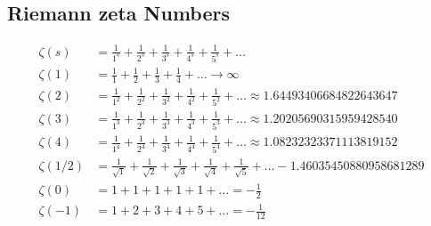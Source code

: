 \documentclass[12pt]{article}
\begin{document}
\subsection*{Riemann zeta Numbers}
\begin{align*}
 \zeta(s) 
  & = \frac{1}{1^{s}} + \frac{1}{2^{s}} + \frac{1}{3^{s}} + \frac{1}{4^{s}} + \frac{1}{5^{s}} + \ldots \\
 \zeta(1) 
  & = \frac{1}{1} + \frac{1}{2} + \frac{1}{3} + \frac{1}{4} + \ldots \rightarrow \infty \\
 \zeta(2) 
  & = \frac{1}{1^{2}} + \frac{1}{2^{2}} + \frac{1}{3^{2}} + \frac{1}{4^{2}} + \frac{1}{5^{2}} + \ldots \approx 1.64493 40668 48226 43647 \\
 \zeta(3) 
  & = \frac{1}{1^{3}} + \frac{1}{2^{3}} + \frac{1}{3^{3}} + \frac{1}{4^{3}} + \frac{1}{5^{3}} + \ldots \approx 1.20205 69031 59594 28540 \\
 \zeta(4) 
  & = \frac{1}{1^{4}} + \frac{1}{2^{4}} + \frac{1}{3^{4}} + \frac{1}{4^{4}} + \frac{1}{5^{4}} + \ldots \approx 1.08232 32337 11138 19152 \\
 \zeta(1/2) 
  & = \frac{1}{\sqrt{1}} + \frac{1}{\sqrt{2}} + \frac{1}{\sqrt{3}} + \frac{1}{\sqrt{4}} + \frac{1}{\sqrt{5}} + \ldots  -1.46035 45088 09586 81289 \\
 \zeta(0) 
  & = 1 + 1 + 1 + 1 + 1 + \ldots = -\frac{1}{2} \\
\zeta(-1) 
  & = 1 + 2 + 3 + 4 + 5 + \ldots = -\frac{1}{12} \\
\end{align*}
\end{document}
